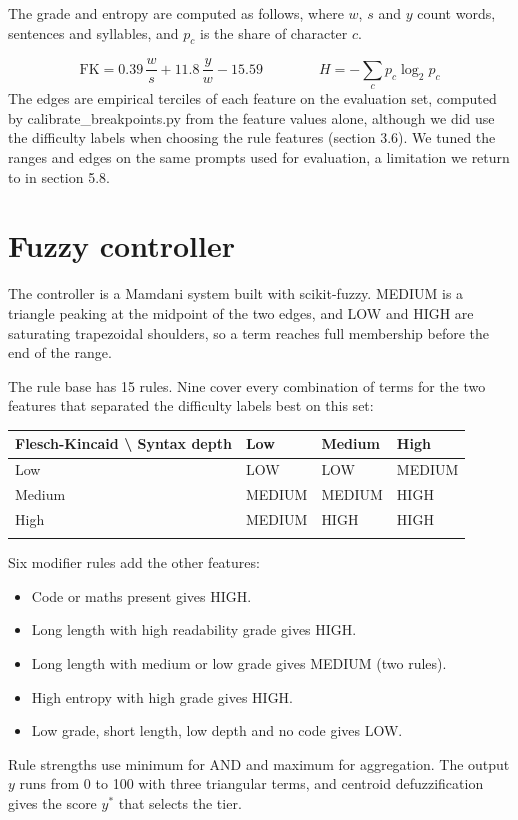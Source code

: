 The grade and entropy are computed as follows, where $w$, $s$ and $y$ count words, sentences and syllables, and $p_c$ is the share of character $c$.

\begin{equation}
\mathrm{FK} = 0.39\,\frac{w}{s} + 11.8\,\frac{y}{w} - 15.59\qquad\qquad H = -\sum_c p_c \log_2 p_c
\end{equation}
The edges are empirical terciles of each feature on the evaluation set, computed by calibrate\_\allowbreak{}breakpoints.py from the feature values alone, although we did use the difficulty labels when choosing the rule features (section 3.6). We tuned the ranges and edges on the same prompts used for evaluation, a limitation we return to in section 5.8.

\section{Fuzzy controller}
The controller is a Mamdani system built with scikit-fuzzy. MEDIUM is a triangle peaking at the midpoint of the two edges, and LOW and HIGH are saturating trapezoidal shoulders, so a term reaches full membership before the end of the range.

The rule base has 15 rules. Nine cover every combination of terms for the two features that separated the difficulty labels best on this set:


\begingroup\footnotesize\setlength{\tabcolsep}{4pt}
\begin{longtable}{>{\raggedright\arraybackslash}p{52.7mm}>{\raggedright\arraybackslash}p{28.5mm}>{\raggedright\arraybackslash}p{29.0mm}>{\raggedright\arraybackslash}p{28.5mm}}
\toprule
\textbf{Flesch-Kincaid \textbackslash{} Syntax depth} & \textbf{Low} & \textbf{Medium} & \textbf{High} \\
\midrule
\endhead
Low & LOW & LOW & MEDIUM \\*
Medium & MEDIUM & MEDIUM & HIGH \\*
High & MEDIUM & HIGH & HIGH \\*
\bottomrule\noalign{\nobreak}
\end{longtable}
\addtocounter{table}{-1}
\endgroup

Six modifier rules add the other features:

\begin{itemize}
\item Code or maths present gives HIGH.
\item Long length with high readability grade gives HIGH.
\item Long length with medium or low grade gives MEDIUM (two rules).
\item High entropy with high grade gives HIGH.
\item Low grade, short length, low depth and no code gives LOW.
\end{itemize}
Rule strengths use minimum for AND and maximum for aggregation. The output $y$ runs from 0 to 100 with three triangular terms, and centroid defuzzification gives the score $y^{*}$ that selects the tier.


